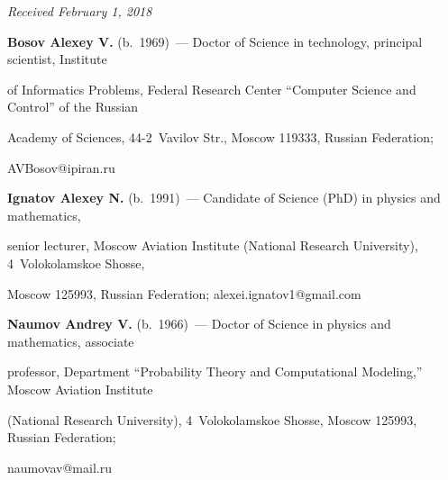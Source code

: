\hfill{\small\textit{Received February 1, 2018}}










\vspace*{-12pt}





\Contr





\noindent


\textbf{Bosov Alexey V.} (b.\ 1969)~--- Doctor of Science in technology, principal scientist, Institute 


of Informatics Problems, Federal Research Center ``Computer Science and Control'' of the Russian 


Academy of Sciences, 44-2~Vavilov Str., Moscow 119333, Russian Federation; 


\mbox{AVBosov@ipiran.ru}





\vspace*{3pt}





\noindent


\textbf{Ignatov Alexey N.} (b.\ 1991)~--- Candidate of Science (PhD) in physics and mathematics, 


senior lecturer, Moscow Aviation Institute (National Research University), 4~Volokolamskoe Shosse, 


Moscow 125993, Russian Federation; \mbox{alexei.ignatov1@gmail.com}





\vspace*{3pt}





\noindent


\textbf{Naumov Andrey V.} (b.\ 1966)~--- Doctor of Science in physics and mathematics, associate 


professor, Department ``Probability Theory and Computational Modeling,'' Moscow Aviation Institute 


(National Research University), 4~Volokolamskoe Shosse, Moscow 125993, Russian Federation; 


\mbox{naumovav@mail.ru}





\label{end\stat}





\renewcommand{\bibname}{\protect\rm Литература}       



